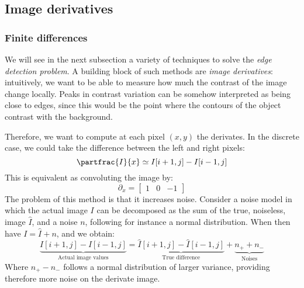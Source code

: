 
\subsection{Image derivatives}
\subsubsection{Finite differences}
We will see in the next subsection a variety of techniques to solve the \emph{edge detection problem}. A building block of such methods are \emph{image derivatives}: intuitively, we want to be able to measure how much the contrast of the image change locally. Peaks in contrast variation can be somehow interpreted as being close to edges, since this would be the point where the contours of the object contrast with the background.

Therefore, we want to compute at each pixel $(x, y)$ the derivates. In the discrete case, we could take the difference between the left and right pixels:
\begin{equation*}
    \partfrac{I}{x} \simeq I[i+1, j] - I[i-1,j]
\end{equation*}
This is equivalent as convoluting the image by:
\begin{equation*}
    \partial_x = \begin{bmatrix}
        1&0&-1
    \end{bmatrix}
\end{equation*}
The problem of this method is that it increases noise. Consider a noise model in which the actual image $I$ can be decomposed as the sum of the true, noiseless, image $\hat{I}$, and a noise $n$, following for instance a normal distribution. When then have $I=\hat{I}+n$, and we obtain:
\begin{equation*}
    \underbrace{I[i+1,j]-I[i-1,j]}_{\text{Actual image values}}=\underbrace{\hat{I}[i+1,j]-\hat{I}[i-1,j]}_{\text{True difference}}+\underbrace{n_++n_-}_{\text{Noises}}
\end{equation*}
Where $n_+-n_-$ follows a normal distribution of larger variance, providing therefore more noise on the derivate image.

